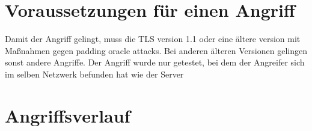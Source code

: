\documentclass[a4paper,10pt]{scrartcl}
\begin{document}
    \section{Voraussetzungen für einen Angriff}\label{sec:voraussetzungen-fur-einen-angriff}
    Damit der Angriff gelingt, muss die TLS version 1.1 oder eine ältere version mit Maßnahmen gegen padding oracle attacks.
    Bei anderen älteren Versionen gelingen sonst andere Angriffe.
    Der Angriff wurde nur getestet, bei dem der Angreifer sich im selben Netzwerk befunden hat wie der Server\cite[S. 11]{AlFardan2013}


    \section{Angriffsverlauf}\label{sec:angriffsverlauf}
\end{document}
